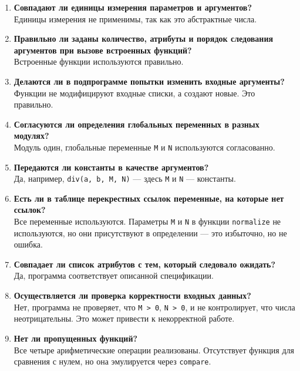 \documentclass{article}[14pt]
\begin{document}
\begin{enumerate}
\item \textbf{Совпадают ли единицы измерения параметров и аргументов?}
\\
Единицы измерения не применимы, так как это абстрактные числа.

\item \textbf{Правильно ли заданы количество, атрибуты и порядок следования аргументов при вызове встроенных функций?}
\\
Встроенные функции используются правильно.

\item \textbf{Делаются ли в подпрограмме попытки изменить входные аргументы?}
\\
Функции не модифицируют входные списки, а создают новые. Это правильно.

\item \textbf{Согласуются ли определения глобальных переменных в разных модулях?}
\\
Модуль один, глобальные переменные \texttt{M} и \texttt{N} используются согласованно.

\item \textbf{Передаются ли константы в качестве аргументов?}
\\
Да, например, \texttt{div(a, b, M, N)} — здесь \texttt{M} и \texttt{N} — константы.

\item \textbf{Есть ли в таблице перекрестных ссылок переменные, на которые нет ссылок?}
\\
Все переменные используются. Параметры \texttt{M} и \texttt{N} в функции \texttt{normalize} не используются, но они присутствуют в определении — это избыточно, но не ошибка.

\item \textbf{Совпадает ли список атрибутов с тем, который следовало ожидать?}
\\
Да, программа соответствует описанной спецификации.

\item \textbf{Осуществляется ли проверка корректности входных данных?}
\\
Нет, программа не проверяет, что \texttt{M > 0}, \texttt{N > 0}, и не контролирует, что числа неотрицательны. Это может привести к некорректной работе.

\item \textbf{Нет ли пропущенных функций?}
\\
Все четыре арифметические операции реализованы. Отсутствует функция для сравнения с нулем, но она эмулируется через \texttt{compare}.

\end{enumerate}
\end{document}
